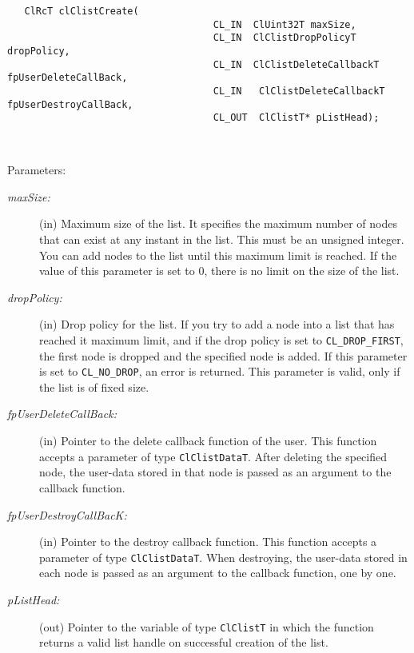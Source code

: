 \begin{flushleft}
\begin{Desc}
\footnotesize\begin{verbatim}   ClRcT clClistCreate(
                      				CL_IN  ClUint32T maxSize,
                      				CL_IN  ClClistDropPolicyT dropPolicy,
                      				CL_IN  ClClistDeleteCallbackT fpUserDeleteCallBack,
                      				CL_IN   ClClistDeleteCallbackT fpUserDestroyCallBack,
                      				CL_OUT  ClClistT* pListHead);
                      
                    
\end{verbatim}
\normalsize
\end{Desc}
\begin{Desc}
\item[Parameters:]
\begin{description}
\item[{\em max\-Size:}](in) Maximum size of the list. It specifies the maximum number of nodes that can exist at any instant in the list.
This must be an unsigned integer. You can add nodes to the list until this maximum limit is reached. If the value of this parameter is set to 0, there 
is no limit on the size of the list.
\item[{\em drop\-Policy:}](in) Drop policy for the list. If you try to add a node into a list that has reached it maximum limit, and if the
drop policy is set to {\tt{CL\_\-DROP\_\-FIRST}}, the first node is dropped and the specified node is added. If this parameter is set to
{\tt{CL\_\-NO\_\-DROP}}, an error is returned. This parameter is valid, only if the list is of fixed size.
\item[{\em fp\-User\-Delete\-Call\-Back:}](in) Pointer to the delete callback function of the user. This function accepts a parameter of type 
{\tt Cl\-Clist\-Data\-T\/}. After deleting the specified node, the user-data stored in that node is passed as an argument to the callback function.
\item[{\em fp\-User\-Destroy\-Call\-Bac\-K:}](in) Pointer to the destroy callback function. This function accepts a parameter of type 
{\tt Cl\-Clist\-Data\-T}. When destroying, the user-data stored in each node is passed as an argument to the callback function, one by one.
\item[{\em p\-List\-Head:}](out) Pointer to the variable of type {\tt{Cl\-Clist\-T}} in 
which the function returns a valid list handle on successful creation of the list.\end{description}
\end{Desc}
\begin{Desc}

\end{Desc}
\end{flushleft}
